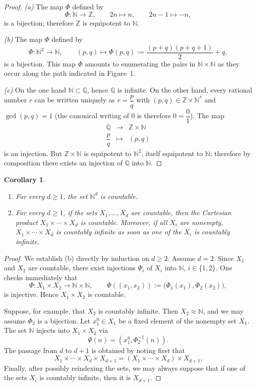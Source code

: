 \documentclass[11pt]{article}
\newtheorem{corollary}{Corollary}[section]
\theoremstyle{definition}
\begin{document}
\begin{proof}
\emph{(a)} The map $\Phi$ defined by
\[
\Phi:\mathbb N\longrightarrow\mathbb Z,\qquad
2n\longmapsto n,\qquad
2n-1\longmapsto -n,
\]
is a bijection; therefore $\mathbb Z$ is equipotent to $\mathbb N$.

\emph{(b)} The map $\Phi$ defined by
\[
\Phi:\mathbb N^2\longrightarrow\mathbb N,\qquad
(p,q)\longmapsto \Phi(p,q):=\frac{(p+q)(p+q+1)}{2}+q,
\]
is a bijection.
This map $\Phi$ amounts to enumerating the pairs in $\mathbb N\times\mathbb N$ as they occur along the path indicated in Figure~1.

\emph{(c)} On the one hand $\mathbb N\subset\mathbb Q$, hence $\mathbb Q$ is infinite.
On the other hand, every rational number $r$ can be written uniquely as $r=\dfrac{p}{q}$ with $(p,q)\in\mathbb Z\times\mathbb N^{\!*}$ and $\gcd(p,q)=1$ (the canonical writing of $0$ is therefore $0=\dfrac{0}{1}$).
The map
\[
\begin{array}{rcl}
\mathbb Q &\longrightarrow& \mathbb Z\times\mathbb N\\[2pt]
\dfrac{p}{q} &\longmapsto& (p,q)
\end{array}
\]
is an injection.
But $\mathbb Z\times\mathbb N$ is equipotent to $\mathbb N^2$, itself equipotent to $\mathbb N$; therefore by composition there exists an injection of $\mathbb Q$ into $\mathbb N$.
\end{proof}

\begin{corollary}
\begin{enumerate}[label=(\alph*),leftmargin=2em]
\item For every $d\ge 1$, the set $\mathbb N^{d}$ is countable.
\item For every $d\ge 1$, if the sets $X_1,\dots,X_d$ are countable, then the Cartesian product $X_1\times\cdots\times X_d$ is countable.
Moreover, if all $X_i$ are nonempty, $X_1\times\cdots\times X_d$ is countably infinite as soon as one of the $X_i$ is countably infinite.
\end{enumerate}
\end{corollary}

\begin{proof}
We establish (b) directly by induction on $d\ge 2$.
Assume $d=2$.
Since $X_1$ and $X_2$ are countable, there exist injections $\Phi_i$ of $X_i$ into $\mathbb N$, $i\in\{1,2\}$.
One checks immediately that
\[
\Phi:X_1\times X_2\longrightarrow \mathbb N\times\mathbb N,\qquad
\Phi((x_1,x_2)):=\bigl(\Phi_1(x_1),\Phi_2(x_2)\bigr),
\]
is injective.
Hence $X_1\times X_2$ is countable.

Suppose, for example, that $X_2$ is countably infinite.
Then $X_2\approx \mathbb N$, and we may assume $\Phi_2$ is a bijection.
Let $x_1^0\in X_1$ be a fixed element of the nonempty set $X_1$.
The set $\mathbb N$ injects into $X_1\times X_2$ via
\[
\Psi(n)=(x_1^0,\Phi_2^{-1}(n)).
\]
The passage from $d$ to $d+1$ is obtained by noting first that
\[
X_1\times\cdots\times X_d\times X_{d+1}=(X_1\times\cdots\times X_d)\times X_{d+1}.
\]
Finally, after possibly reindexing the sets, we may always suppose that if one of the sets $X_i$ is countably infinite, then it is $X_{d+1}$.
\end{proof}
\end{document}
